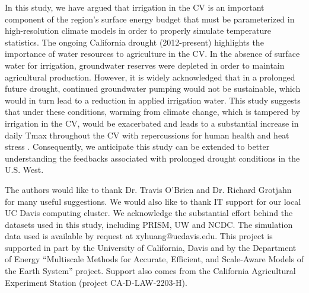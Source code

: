 \documentclass[draft,ms]{agutex}   %
\begin{document}
\begin{article}
In this study, we have argued that irrigation in the CV is an important component of the region's surface energy budget that must be parameterized in high-resolution climate models in order to properly simulate temperature statistics. The ongoing California drought (2012-present) highlights the importance of water resources to agriculture in the CV. In the absence of surface water for irrigation, groundwater reserves were depleted in order to maintain agricultural production.  However, it is widely acknowledged that in a prolonged future drought, continued groundwater pumping would not be sustainable, which would in turn lead to a reduction in applied irrigation water.  This study suggests that under these conditions, warming from climate change, which is tampered by irrigation in the CV, would be exacerbated and leads to a substantial increase in daily Tmax throughout the CV with repercussions for human health and heat stress \citep{williams2015contribution}. Consequently, we anticipate this study can be extended to better understanding the feedbacks associated with prolonged drought conditions in the U.S. West.

\begin{acknowledgments}

The authors would like to thank Dr. Travis O'Brien and Dr. Richard Grotjahn for many useful suggestions. We would also like to thank IT support for our local UC Davis computing cluster. We acknowledge the substantial effort behind the datasets used in this study, including PRISM, UW and NCDC. The simulation data used is available by request at xyhuang@ucdavis.edu. This project is supported in part by the University of California, Davis and by the Department of Energy ``Multiscale Methods for Accurate, Efficient, and Scale-Aware Models of the Earth System'' project. Support also comes from the California Agricultural Experiment Station (project CA-D-LAW-2203-H). 

\end{acknowledgments}




\end{article}


\clearpage
\end{document}
